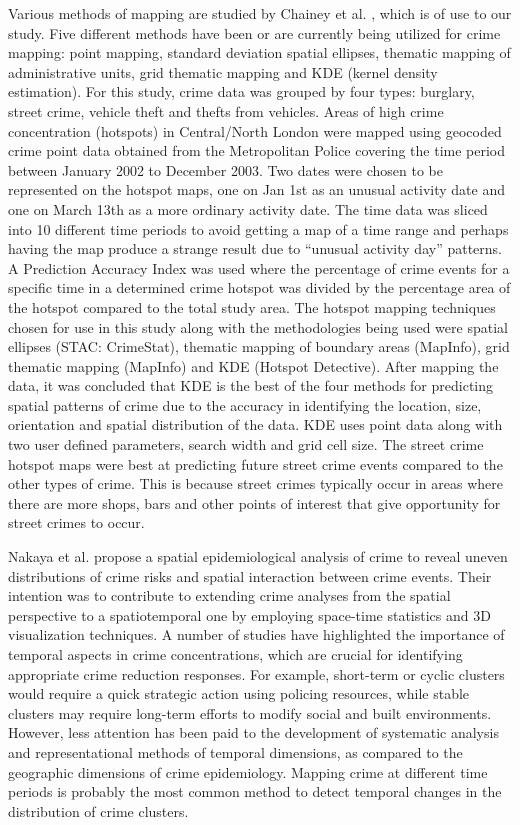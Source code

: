 \documentclass{sigkddExp}
\begin{document}
Various methods of mapping are studied by Chainey et al. \cite{Chainey}, which is of use to our study. Five different methods have been or are currently being utilized for crime mapping: point mapping, standard deviation spatial ellipses, thematic mapping of administrative units, grid thematic mapping and KDE (kernel density estimation). For this study, crime data was grouped by four types: burglary, street crime, vehicle theft and thefts from vehicles. Areas of high crime concentration (hotspots) in Central/North London were mapped using geocoded crime point data obtained from the Metropolitan Police covering the time period between January 2002 to December 2003. Two dates were chosen to be represented on the hotspot maps, one on Jan 1st as an unusual activity date and one on March 13th as a more ordinary activity date. The time data was sliced into 10 different time periods to avoid getting a map of a time range and perhaps having the map produce a strange result due to “unusual activity day” patterns. A Prediction Accuracy Index was used where the percentage of crime events for a specific time in a determined crime hotspot was divided by the percentage area of the hotspot compared to the total study area. The hotspot mapping techniques chosen for use in this study along with the methodologies being used were spatial ellipses (STAC: CrimeStat), thematic mapping of boundary areas (MapInfo), grid thematic mapping (MapInfo) and KDE (Hotspot Detective). After mapping the data, it was concluded that KDE is the best of the four methods for predicting spatial patterns of crime due to the accuracy in identifying the location, size, orientation and spatial distribution of the data. KDE uses point data along with two user defined parameters, search width and grid cell size. The street crime hotspot maps were best at predicting future street crime events compared to the other types of crime. This is because street crimes typically occur in areas where there are more shops, bars and other points of interest that give opportunity for street crimes to occur. 

 Nakaya et al. \cite{visCrime} propose a spatial epidemiological analysis of crime to reveal uneven distributions of crime risks and spatial interaction between crime events. Their intention was to contribute to extending crime analyses from the spatial perspective to a spatiotemporal one by employing space-time statistics and 3D visualization techniques. A number of studies have highlighted the importance of temporal aspects in crime concentrations, which are crucial for identifying appropriate crime reduction responses. For example, short-term or cyclic clusters would require a quick strategic action using policing resources, while stable clusters may require long-term efforts to modify social and built environments. However, less attention has been paid to the development of systematic analysis and representational methods of temporal dimensions, as compared to the geographic dimensions of crime epidemiology. Mapping crime at different time periods is probably the most common method to detect temporal changes in the distribution of crime clusters.
\end{document}
